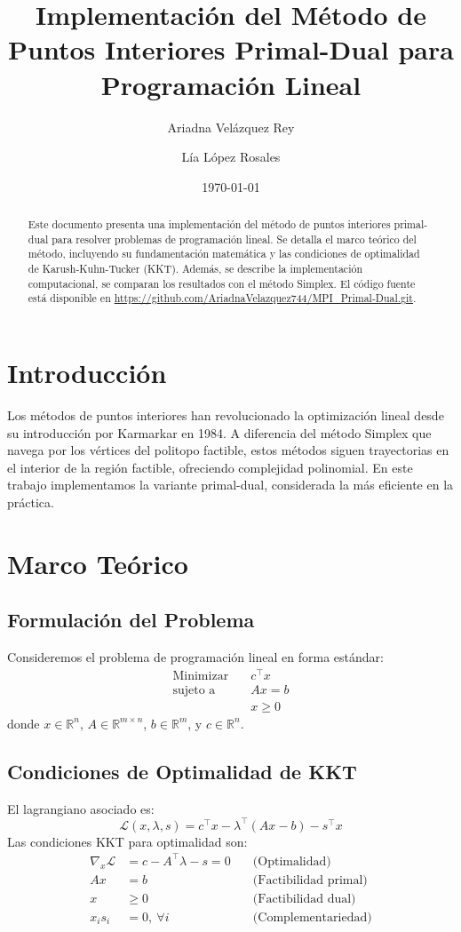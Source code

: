 \documentclass{article}
\title{Implementación del Método de Puntos Interiores Primal-Dual para Programación Lineal}
\author{Ariadna Velázquez Rey \and Lía López Rosales}
\date{\today}
\begin{document}
\maketitle

\begin{abstract}
Este documento presenta una implementación del método de puntos interiores primal-dual para resolver problemas de programación lineal. Se detalla el marco teórico del método, incluyendo su fundamentación matemática y las condiciones de optimalidad de Karush-Kuhn-Tucker (KKT). Además, se describe la implementación computacional, se comparan los resultados con el método Simplex. El código fuente está disponible en \url{https://github.com/AriadnaVelazquez744/MPI_Primal-Dual.git}.
\end{abstract}

\section{Introducción}
Los métodos de puntos interiores han revolucionado la optimización lineal desde su introducción por Karmarkar en 1984. A diferencia del método Simplex que navega por los vértices del politopo factible, estos métodos siguen trayectorias en el interior de la región factible, ofreciendo complejidad polinomial. En este trabajo implementamos la variante primal-dual, considerada la más eficiente en la práctica.

\section{Marco Teórico}

\subsection{Formulación del Problema}
Consideremos el problema de programación lineal en forma estándar:
\begin{align*}
\text{Minimizar} \quad & c^\top x \\
\text{sujeto a} \quad & Ax = b \\
& x \geq 0
\end{align*}
donde $x \in \mathbb{R}^n$, $A \in \mathbb{R}^{m \times n}$, $b \in \mathbb{R}^m$, y $c \in \mathbb{R}^n$.

\subsection{Condiciones de Optimalidad de KKT}
El lagrangiano asociado es:
\[
\mathcal{L}(x, \lambda, s) = c^\top x - \lambda^\top(Ax - b) - s^\top x
\]
Las condiciones KKT para optimalidad son:
\begin{align*}
\nabla_x \mathcal{L} &= c - A^\top \lambda - s = 0 \quad &\text{(Optimalidad)} \\
Ax &= b \quad &\text{(Factibilidad primal)} \\
x &\geq 0 \quad &\text{(Factibilidad dual)} \\
x_i s_i &= 0,\ \forall i \quad &\text{(Complementariedad)}
\end{align*}
\end{document}
